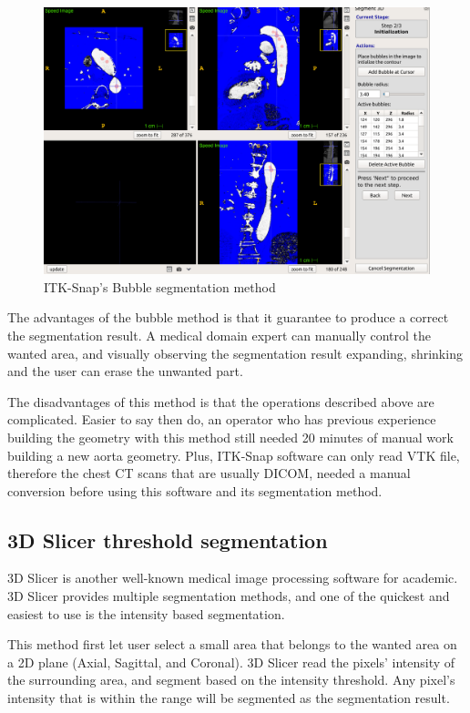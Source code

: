 \begin{figure}[ht]
    \centering
    \includegraphics[width=\textwidth]{figures/AGR/bubbles.png}
    \caption[ITK-Snap's Bubble segmentation UI]{ITK-Snap's Bubble segmentation method \cite{py06nimg}}
    \label{fig_ITK}
\end{figure}

The advantages of the bubble method is that it guarantee to produce a correct the segmentation result. A medical domain expert can manually control the wanted area, and visually observing the segmentation result expanding, shrinking and the user can erase the unwanted part.

The disadvantages of this method is that the operations described above are complicated. Easier to say then do, an operator who has previous experience building the geometry with this method still needed 20 minutes of manual work building a new aorta geometry. Plus, ITK-Snap software can only read VTK file, therefore the chest CT scans that are usually DICOM, needed a manual conversion before using this software and its segmentation method.

\subsection{3D Slicer threshold segmentation}
3D Slicer is another well-known medical image processing software for academic. 3D Slicer provides multiple segmentation methods, and one of the quickest and easiest to use is the intensity based segmentation.

This method first let user select a small area that belongs to the wanted area on a 2D plane (Axial, Sagittal, and Coronal). 3D Slicer read the pixels' intensity of the surrounding area, and segment based on the intensity threshold. Any pixel's intensity that is within the range will be segmented as the segmentation result. 

